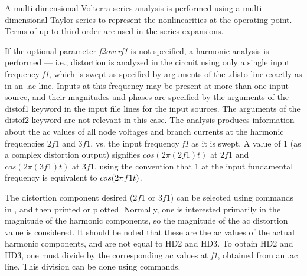 A multi-dimensional Volterra series analysis is performed using a
multi-dimensional Taylor series to represent the nonlinearities at the
operating point.  Terms of up to third order are used in the series
expansions.

If the optional parameter {\it f2overf1\/} is not specified, a
harmonic analysis is performed --- i.e., distortion is analyzed in the
circuit using only a single input frequency {\it f1}, which is swept
as specified by arguments of the {\vt .disto} line exactly as in an
{\vt .ac} line.  Inputs at this frequency may be present at more than
one input source, and their magnitudes and phases are specified by the
arguments of the {\vt distof1} keyword in the input file lines for the
input sources.  The arguments of the {\vt distof2} keyword are not
relevant in this case.  The analysis produces information about the ac
values of all node voltages and branch currents at the harmonic
frequencies $2f1$ and $3f1$, vs.  the input frequency {\it f1} as it
is swept.  A value of 1 (as a complex distortion output) signifies
$cos(2\pi(2f1)t)$ at $2f1$ and $cos(2\pi(3f1)t)$ at $3f1$, using the
convention that 1 at the input fundamental frequency is equivalent to
$cos(2\pi\/f1\/t)$.

The distortion component desired ($2f1$ or $3f1$) can be selected
using commands in {\WRspice}, and then printed or plotted.  Normally,
one is interested primarily in the magnitude of the harmonic
components, so the magnitude of the ac distortion value is considered. 
It should be noted that these are the ac values of the actual harmonic
components, and are not equal to HD2 and HD3.  To obtain HD2 and HD3,
one must divide by the corresponding ac values at {\it f1}, obtained
from an {\vt .ac} line.  This division can be done using {\WRspice}
commands.

